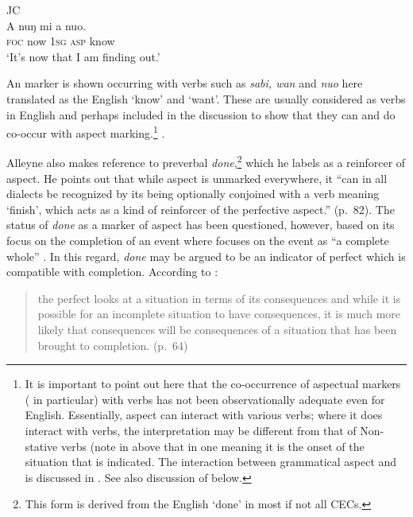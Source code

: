 \ex
JC\\
\gll  A nuŋ mi a nuo.\\
\textsc{foc} now \textsc{1sg} \textsc{asp} know\\
\glt `It’s now that I am finding out.'
\z
\z

An  marker is shown occurring with verbs such as
\textit{sabi, wan} and \textit{nuo} here translated as the English
`know' and `want'.  These are usually considered as  verbs in
English and perhaps included in the discussion to show that they can
and do co-occur with  aspect marking.\footnote{It is
  important to point out here that the co-occurrence of 
  aspectual markers ( in particular) with  verbs
  \citep{Vendler1967} has not been observationally adequate even for
  English. Essentially,  aspect can interact with various
  verbs; where it does interact with  verbs, the interpretation
  may be different from that of Non-stative verbs (note in
   above that in one meaning it is the onset of the
  situation that is indicated. The interaction between grammatical
  aspect and  is discussed in . See also
  discussion of \citet{Sidnell2002} below.} .

Alleyne also makes reference to preverbal \textit{done},\footnote{This
  form is derived from the English `done' in most if not all CECs.}
which he labels as a reinforcer of  aspect.  He points out
that while  aspect is unmarked everywhere, it ``can in all
dialects be recognized by its being optionally conjoined with a verb
meaning `finish',  which acts as a kind of reinforcer of the perfective
aspect.” (p.~82).  The status of \textit{done} as a marker of
 aspect has been questioned, however, based on its focus on
the completion of an event where  focuses on the event as “a
complete whole” \citep{Comrie1976}.  In this regard, \textit{done} may
be argued to be an indicator of perfect  which is compatible with
completion.  According to \citet{Comrie1976}:

\begin{quote}
the perfect looks at a situation in terms of its consequences and
while it is possible for an incomplete situation to have consequences,
it is much more likely that consequences will be consequences of a
situation that has been brought to completion. (p.~64)
\end{quote}

